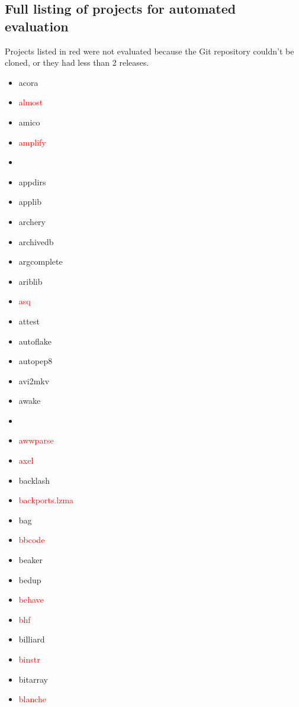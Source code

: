 \documentclass{l4proj}
\begin{document}
\begin{appendices}
\section{Full listing of projects for automated evaluation}

Projects listed in red were not evaluated because the Git repository
couldn't be cloned, or they had less than 2 releases.

\noindent\parbox[t]{0.32\textwidth}{\raggedright%
\begin{itemize}
\item acora
\item\textcolor{red}{almost}
\item amico
\item\textcolor{red}{amplify}
\item {}
\item appdirs
\item applib
\item archery
\item archivedb
\item argcomplete
\item ariblib
\item\textcolor{red}{asq}
\item attest
\item autoflake
\item autopep8
\item avi2mkv
\item awake
\end{itemize}
}%
\noindent\parbox[t]{0.32\textwidth}{\raggedright%
\begin{itemize}
\item\textcolor{red}{}
\item\textcolor{red}{awwparse}
\item\textcolor{red}{axel}
\item backlash
\item\textcolor{red}{backports.lzma}
\item bag
\item\textcolor{red}{bbcode}
\item beaker
\item bedup
\item\textcolor{red}{behave}
\item\textcolor{red}{bhf}
\item billiard
\item\textcolor{red}{binstr}
\item bitarray
\item\textcolor{red}{blanche}

\end{itemize}}
\end{appendices}
\end{document}
